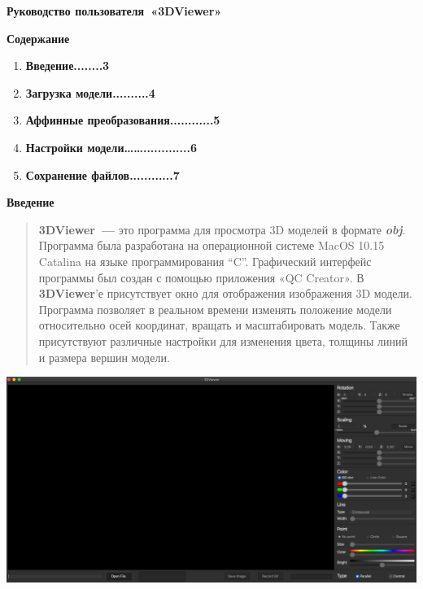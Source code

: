 \documentclass[
]{article}
\author{}
\date{}
\begin{document}
\begin{center}

\Huge
\textbf{Руководство пользователя~«3DViewer»}
\end{center}
\pagebreak[5]
\huge
\textbf{Содержание}
\LARGE
\begin{enumerate}
\def\labelenumi{\arabic{enumi}.}
\item
  \textbf{Введение........3}
\item
  \textbf{Загрузка модели..........4}
\item
  \textbf{Аффинные преобразования............5}
\item
  \textbf{Настройки
  модели\ldots\ldots.............6}
\item
  \textbf{Сохранение файлов............7}
\end{enumerate}
\pagebreak[5]
\huge
\textbf{Введение}
\newline
\LARGE
\begin{quote}
\textbf{3DViewer~---} это программа для просмотра 3D моделей в формате
\emph{\textbf{obj}}. Программа была разработана на операционной системе
MacOS 10.15 Catalina на языке программирования ``C''. Графический
интерфейс программы был создан с помощью приложения «QC Creator».
\newline
В \textbf{3DViewer}'е присутствует окно для отображения изображения 3D
модели. Программа позволяет в реальном времени изменять положение модели
относительно осей координат, вращать и масштабировать модель. Также
присутствуют различные настройки для изменения цвета, толщины линий и
размера вершин модели.
\end{quote}
\includegraphics[bb=0 0 1200 650]{media/image1.png}
\pagebreak[15]
\end{document}
